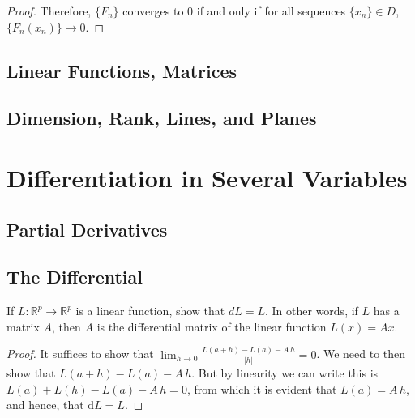 \documentclass[12pt]{book}
\newcommand{\R}{\mathbb{R}}
\newenvironment{exercise}[2][Exercise]{\begin{trivlist}
\item[\hskip \labelsep {\bfseries #1}\hskip \labelsep {\bfseries #2.}]}{\end{trivlist}}
\begin{document}
\begin{exercise}{7.2.7}
\begin{exercise}{8.3.12}
\begin{proof}
    Therefore, $\{F_n\}$ converges to 0 if and only if for all sequences $\{x_n\} \in D$, $\{ F_n(x_n)\} \to 0$.
\end{proof}
\end{exercise}





\section{Linear Functions, Matrices}


\section{Dimension, Rank, Lines, and Planes}



\chapter{Differentiation in Several Variables}
\section{Partial Derivatives}



\section{The Differential}


\begin{exercise}{9.2.1}
	If $L: \R^p \to \R^p$ is a linear function, show that $dL=L$. In other words, if $L$ has a matrix $A$, then $A$ is the differential matrix of the linear function $L(x)=A x$.

	\begin{proof}
    It suffices to show that $\lim_{h \to 0} \frac{L(a+h)-L(a)-A\,h}{|h|}=0$. We need to then show that $L(a+h)-L(a)-A\,h$. But by linearity we can write this is $L(a)+L(h)-L(a)-A\,h =0 $, from which it is evident that $L(a)=A\,h$, and hence, that $\text{d}L=L$.
	\end{proof}
\end{exercise}



\end{exercise}
\end{document}
